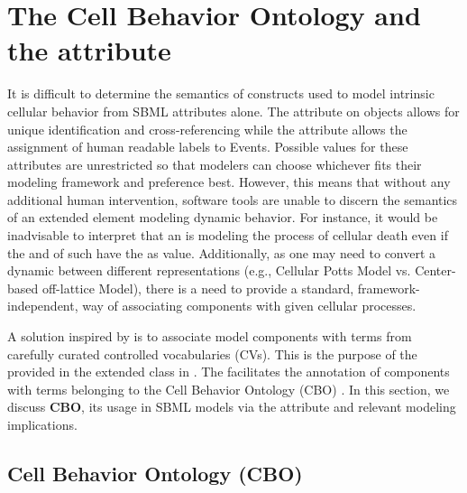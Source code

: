 
\section{The Cell Behavior Ontology and the  attribute}
\label{sec:CBO}

It is difficult to determine the semantics of \Event constructs used to model intrinsic cellular behavior from SBML attributes alone. The  attribute on \Event objects allows for unique identification and cross-referencing while the  attribute allows the assignment of human readable labels to Events. Possible values for these attributes are unrestricted so that modelers can choose whichever fits their modeling framework and preference best. However, this means that without any additional human intervention, software tools are unable to discern the semantics of an extended \Event element modeling dynamic behavior. For instance, it would be inadvisable to interpret that an \Event is modeling the process of cellular death even if the  and  of such \Event have the   as value. Additionally, as one may need to convert a dynamic \Event between different representations (e.g., Cellular Potts Model vs. Center-based off-lattice Model), there is a need to provide a standard, framework-independent, way of associating \Event components with given cellular processes.

A solution inspired by \sbmlthreecore is to associate model components with terms from carefully curated controlled vocabularies (CVs). This is the purpose of the  provided in the extended \Event class in . The  facilitates the annotation of \Event components with terms belonging to the Cell Behavior Ontology (CBO) \citep{Sluka2014}. In this section, we discuss \textbf{CBO}, its usage in SBML models via the  attribute and relevant modeling implications.

\subsection{Cell Behavior Ontology (CBO)}
\label{subsec:bioCBO}

